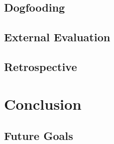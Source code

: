 \documentclass[a4paper]{l3proj}
\begin{document}
\section{Dogfooding}
\label{dogfooding}


\section{External Evaluation}
\label{externalEvaluation}


\section{Retrospective}
\label{retrospective}


\chapter{Conclusion}
\label{conclusion}


\section{Future Goals}
\label{futureGoals}


% 
% 
\end{document}
